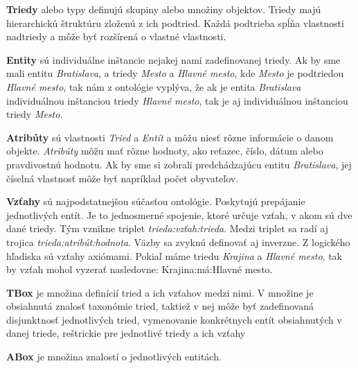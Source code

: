 \documentclass[12pt, a4paper, oneside]{book}
\begin{document}
\textbf{Triedy} alebo typy definujú skupiny alebo množiny objektov. Triedy majú hierarchickú štruktúru zloženú z ich podtried. Každá podtrieba spĺňa vlastnosti nadtriedy a môže byť rozšírená o vlastné vlastnosti.


\textbf{Entity} sú individuálne inštancie nejakej nami zadefinovanej triedy. Ak by sme mali entitu \textit{Bratislava}, a triedy \textit{Mesto} a \textit{Hlavné mesto}, kde \textit{Mesto} je podtriedou \textit{Hlavné mesto}, tak nám z ontológie vyplýva, že ak je entita \textit{Bratislava} individuálnou inštanciou triedy \textit{Hlavné mesto}, tak je aj individuálnou inštanciou triedy \textit{Mesto}.



\textbf{Atribúty} sú vlastnosti \textit{Tried} a \textit{Entít} a môžu niesť rôzne informácie o danom objekte. \textit{Atribúty} môžu mať rôzne hodnoty, ako reťazec, číslo, dátum alebo pravdivostnú hodnotu. Ak by sme si zobrali predchádzajúcu entitu \textit{Bratislava}, jej číselná vlastnosť môže byť napríklad počet obyvateľov.


\textbf{Vzťahy} sú najpodstatnejšou súčasťou ontológie. Poskytujú prepájanie jednotlivých entít. Je to jednosmerné spojenie, ktoré určuje vzťah, v akom sú dve dané triedy. Tým vznikne triplet \textit{trieda:vzťah:trieda}. Medzi triplet sa radí aj trojica \textit{trieda:atribút:hodnota}. Väzby sa zvyknú definovať aj inverzne. Z logického hľadiska sú vzťahy axiómami. Pokiaľ máme triedu \textit{Krajina} a \textit{Hlavné mesto}, tak by vzťah mohol vyzerať nasledovne: Krajina:má:Hlavné mesto.


\textbf{TBox} je množina definícií tried a ich vzťahov medzi nimi. V množine je obsiahnutá znalosť taxonómie tried, taktiež v nej môže byť zadefinovaná disjunktnosť jednotlivých tried, vymenovanie konkrétnych entít obsiahnutých v danej triede, reštrickie pre jednotlivé triedy a ich vzťahy


\textbf{ABox} je množina znalostí o jednotlivých entitách.

\end{document}
